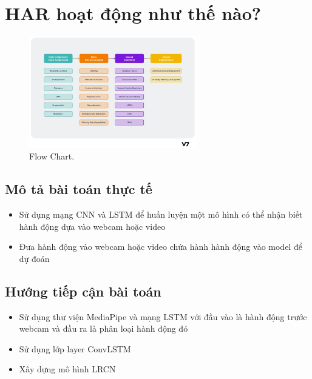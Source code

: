 \section{HAR hoạt động như thế nào?} 

\begin{figure}[h!]
	\centering
	\includegraphics[width=0.65\textwidth]{Figures/flowchart.jpg}
	\caption[Flow Chart.]{Flow Chart.}
	\label{fig:ML}
\end{figure} 

\subsection{Mô tả bài toán thực tế} 

\begin{itemize}
	\item Sử dụng mạng CNN và LSTM để huấn luyện một mô hình có thể nhận biết hành động dựa vào webcam hoặc video  
	
	\item Đưa hành động vào webcam hoặc video chứa hành hành động vào model để dự đoán 

\end{itemize}

\subsection{Hướng tiếp cận bài toán }

\begin{itemize}
	\item Sử dụng thư viện MediaPipe và mạng LSTM với đầu vào là hành động trước webcam và đầu ra là phân loại hành động đó
	
	\item Sử dụng lớp layer ConvLSTM 
        \item Xây dựng mô hình LRCN
 

\end{itemize}

